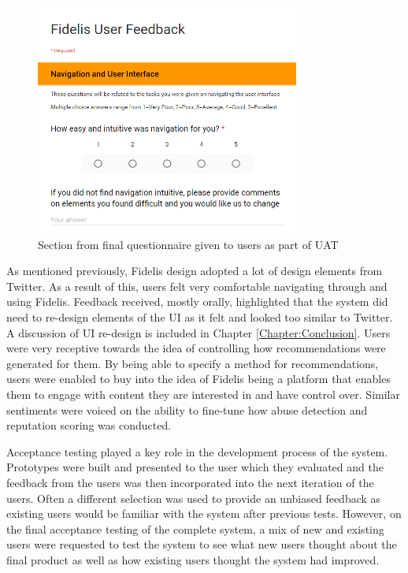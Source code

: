 \begin{figure}[H]
\centering
\includegraphics[height=3in]{Images/Testing/UATQuestionnaire}
\caption{Section from final questionnaire given to users as part of UAT}
\label{fig:UATQuestionnaire}
\end{figure}

As mentioned previously, Fidelis design adopted a lot of design elements from Twitter. As a result of this, users felt very comfortable navigating through and using Fidelis. Feedback received, mostly orally, highlighted that the system did need to re-design elements of the UI as it felt and looked too similar to Twitter. A discussion of UI re-design is included in Chapter \ref{Chapter:Conclusion}. Users were very receptive towards the idea of controlling how recommendations were generated for them. By being able to specify a method for recommendations, users were enabled to buy into the idea of Fidelis being a platform that enables them to engage with content they are interested in and have control over. Similar sentiments were voiced on the ability to fine-tune how abuse detection and reputation scoring was conducted.

Acceptance testing played a key role in the development process of the system. Prototypes were built and presented to the user which they evaluated and the feedback from the users was then incorporated into the next iteration of the users. Often a different selection was used to provide an unbiased feedback as existing users would be familiar with the system after previous tests. However, on the final acceptance testing of the complete system, a mix of new and existing users were requested to test the system to see what new users thought about the final product as well as how existing users thought the system had improved.

